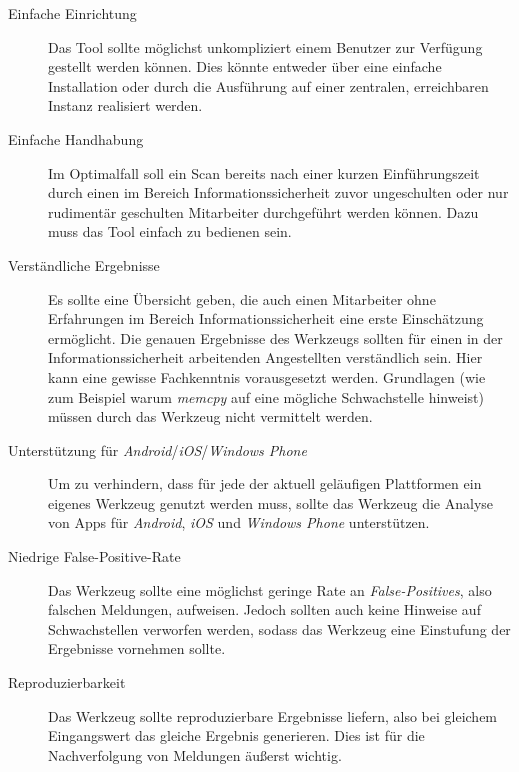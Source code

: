 \begin{description}
	\item[Einfache Einrichtung] Das Tool sollte möglichst unkompliziert einem Benutzer zur Verfügung gestellt werden können. Dies könnte entweder über eine einfache Installation oder durch die Ausführung auf einer zentralen, erreichbaren Instanz realisiert werden.
	
	\item[Einfache Handhabung] Im Optimalfall soll ein Scan bereits nach einer kurzen Einführungszeit durch einen im Bereich Informationssicherheit zuvor ungeschulten oder nur rudimentär geschulten Mitarbeiter durchgeführt werden können. Dazu muss das Tool einfach zu bedienen sein.
	
	\item[Verständliche Ergebnisse] Es sollte eine Übersicht geben, die auch einen Mitarbeiter ohne Erfahrungen im Bereich Informationssicherheit eine erste Einschätzung ermöglicht. Die genauen Ergebnisse des Werkzeugs sollten für einen in der Informationssicherheit arbeitenden Angestellten verständlich sein. Hier kann eine gewisse Fachkenntnis vorausgesetzt werden. Grundlagen (wie zum Beispiel warum \textit{memcpy} auf eine mögliche Schwachstelle hinweist) müssen durch das Werkzeug nicht vermittelt werden.
	
	\item[Unterstützung für \textit{Android}/\textit{iOS}/\textit{Windows Phone}] Um zu verhindern, dass für jede der aktuell geläufigen Plattformen ein eigenes Werkzeug genutzt werden muss, sollte das Werkzeug die Analyse von Apps für \textit{Android}, \textit{iOS} und \textit{Windows Phone} unterstützen.
	
	\item[Niedrige False-Positive-Rate] Das Werkzeug sollte eine möglichst geringe Rate an \textit{False-Positives}, also falschen Meldungen, aufweisen. Jedoch sollten auch keine Hinweise auf Schwachstellen verworfen werden, sodass das Werkzeug eine Einstufung der Ergebnisse vornehmen sollte.
	
	\item[Reproduzierbarkeit] Das Werkzeug sollte reproduzierbare Ergebnisse liefern, also bei gleichem Eingangswert das gleiche Ergebnis generieren. Dies ist für die Nachverfolgung von Meldungen äußerst wichtig.
	
\end{description}



